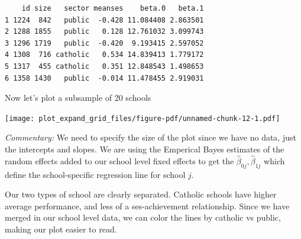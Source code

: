 \documentclass[
  letterpaper,
  DIV=11,
  numbers=noendperiod]{scrreprt}
\newenvironment{Shaded}{}{}
\newcommand{\AttributeTok}[1]{\textcolor[rgb]{0.49,0.56,0.16}{#1}}
\newcommand{\DecValTok}[1]{\textcolor[rgb]{0.25,0.63,0.44}{#1}}
\newcommand{\FloatTok}[1]{\textcolor[rgb]{0.25,0.63,0.44}{#1}}
\newcommand{\FunctionTok}[1]{\textcolor[rgb]{0.02,0.16,0.49}{#1}}
\newcommand{\NormalTok}[1]{#1}
\newcommand{\OtherTok}[1]{\textcolor[rgb]{0.00,0.44,0.13}{#1}}
\newcommand{\SpecialCharTok}[1]{\textcolor[rgb]{0.25,0.44,0.63}{#1}}
\begin{document}
\begin{verbatim}
    id size   sector meanses    beta.0   beta.1
1 1224  842   public  -0.428 11.084408 2.863501
2 1288 1855   public   0.128 12.761032 3.099743
3 1296 1719   public  -0.420  9.193415 2.597052
4 1308  716 catholic   0.534 14.839413 1.779172
5 1317  455 catholic   0.351 12.848543 1.498653
6 1358 1430   public  -0.014 11.478455 2.919031
\end{verbatim}

Now let's plot a subsample of 20 schools

\begin{Shaded}
\end{Shaded}

\texttt{[image: plot\_expand\_grid\_files/figure-pdf/unnamed-chunk-12-1.pdf]}

\emph{Commentary:} We need to specify the size of the plot since we have
no data, just the intercepts and slopes. We are using the Emperical
Bayes estimates of the random effects added to our school level fixed
effects to get the \(\hat{\beta}_{0j}, \hat{\beta}_{1j}\) which define
the school-specific regression line for school \(j\).

Our two types of school are clearly separated. Catholic schools have
higher average performance, and less of a ses-achievement relationship.
Since we have merged in our school level data, we can color the lines by
catholic vs public, making our plot easier to read.
\end{document}
